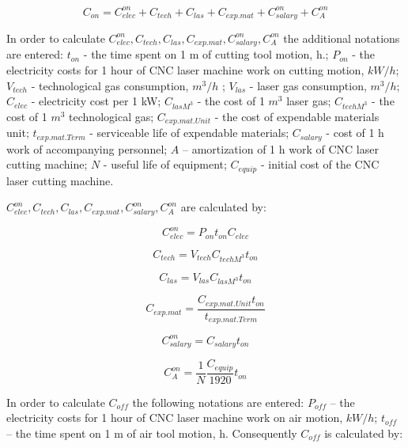 \documentclass[runningheads]{llncs}
\begin{document}
\begin{equation}
C_{on} =
C^{on}_{elec} + C_{tech} + C_{las} + C_{exp.mat} + C^{on}_{salary} + C^{on}_A
\label{eq1.3}
\end{equation}

In order to calculate
$C^{on}_{elec}, C_{tech}, C_{las}, C_{exp.mat}, C^{on}_{salary}, C^{on}_A$
the additional notations are entered:
$t_{on}$  - the time spent on 1 m of cutting tool motion, h.;
$P_{on}$  - the electricity costs for 1 hour of CNC laser machine work on cutting motion, $kW/h$;
$V_{tech}$  - technological gas consumption, $m^3/h$ ;
$V_{las}$ - laser gas consumption, $m^3/h$;
$C_{elec}$  - electricity cost per 1 kW;
$C_{las M^3}$  - the cost of 1 $m^3$ laser gas;
$C_{tech M^3}$  - the cost of 1 $m^3$ technological gas;
$C_{exp.mat.Unit}$  - the cost of expendable materials unit;
$t_{exp.mat.Term}$  - serviceable life of expendable materials;
$C_{salary}$ - cost of 1 h work of accompanying personnel;
$A$ – amortization of 1 h work of CNC laser cutting machine;
$N$ - useful life of equipment;
$C_{equip}$  - initial cost of the CNC laser cutting machine.

$C^{on}_{elec}, C_{tech}, C_{las}, C_{exp.mat}, C^{on}_{salary}, C^{on}_A$
are calculated by:

\begin{equation}
\label{eq1.4}
C^{on}_{elec} = P_{on} t_{on} C_{elec}
\end{equation}

\begin{equation}
  \label{eq1.5}
  C_{tech} = V_{tech} C_{tech M^3} t_{on}
\end{equation}

\begin{equation}
  \label{eq1.6}
  C_{las} = V_{las} C_{las M^3} t_{on}
\end{equation}

\begin{equation}
  \label{eq1.7}
  C_{exp.mat} = \frac{C_{exp.mat.Unit} t_{on}}{t_{exp.mat.Term}}
\end{equation}

\begin{equation}
  \label{eq1.8}
  C^{on}_{salary} = C_{salary} t_{on}
\end{equation}

\begin{equation}
  \label{eq1.9}
  C^{on}_A = \frac{1}N \frac{C_{equip}}{1920} t_{on}
\end{equation}

In order to calculate $C_{off}$
the following notations are entered:
$P_{off}$ – the electricity costs for 1 hour of CNC laser machine work on air motion, $kW/h$;
$t_{off}$ – the time spent on 1 m of air tool motion, h.
Consequently
$C_{off}$
is calculated by:
\end{document}
